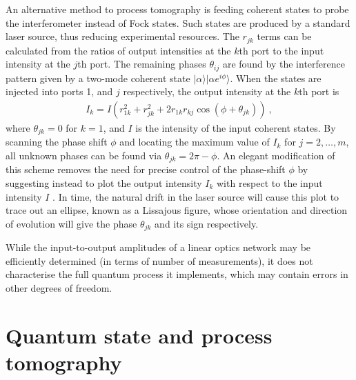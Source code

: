 \documentclass[times,final]{elsarticle}
\newcommand{\ket}[1]{|#1\rangle}
\begin{document}
An alternative method to process tomography is feeding coherent states to probe the interferometer \cite{bib:Rahimi-Keshari13,bib:Heilmann15} instead of Fock states. Such states are produced by a standard laser source, thus reducing experimental resources. The $r_{jk}$ terms can be calculated from the ratios of output intensities at the $k$th port to the input intensity at the $j$th port. The remaining phases $\theta_{ij}$ are found by the interference pattern given by a two-mode coherent state $\ket{\alpha}\ket{\alpha e^{i\phi}}$. When the states are injected into ports 1, and $j$ respectively, the output intensity at the $k$th port is
\begin{align}
I_k=I(r_{1k}^2+r_{jk}^2+2 r_{1k}r_{kj}\cos(\phi+\theta_{jk})) \ ,
\end{align}
where $\theta_{jk}=0$ for $k=1$, and $I$ is the intensity of the input coherent states. By scanning the phase shift $\phi$ and locating the maximum value of $I_k$ for $j=2,\ldots, m$, all unknown phases can be found via $\theta_{jk}=2\pi-\phi$. An elegant modification of this scheme removes the need for precise control of the phase-shift $\phi$ by suggesting instead to plot the output intensity $I_k$ with respect to the input intensity $I$ \cite{bib:Heilmann15}. In time, the natural drift in the laser source will cause this plot to trace out an ellipse, known as a Lissajous figure, whose orientation and direction of evolution will give the phase $\theta_{jk}$ and its sign respectively.

While the input-to-output amplitudes of a linear optics network may be efficiently determined (in terms of number of measurements), it does not characterise the full quantum process it implements, which may contain errors in other degrees of freedom.


\section{Quantum state and process tomography}\label{secQPT}
\end{document}
